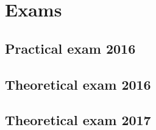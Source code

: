 
\newpage
{}


% 
% 
% 
% 
% 
% 
% 
% 
% 
% 
% 


\part{Exams}
\def\difficulty{0}
\chapter{Practical exam 2016}


\chapter{Theoretical exam 2016}


\chapter{Theoretical exam 2017}


\printindex





\newpage




